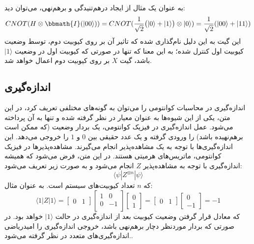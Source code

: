 به عنوان یک مثال از ایجاد درهم‌تنیدگی و برهم‌نهی، می‌توان دید:
\begin{equation}
    CNOT(H\otimes\bbmath{I}(|00\rangle)) = CNOT(\frac{1}{\sqrt{2}} \big( |0\rangle + |1\rangle \big) \otimes |0\rangle ) = \frac{1}{\sqrt{2}} (|00\rangle + |11\rangle)
\end{equation}
این گیت به این دلیل نام‌گذاری شده که تاثیر آن بر روی کیوبیت دوم، توسط وضعیت کیوبیت اول کنترل شده؛ به این معنا که تنها در صورتی که کیوبیت اول در وضعیت
$|1\rangle$
باشد، گیت 
$X$
بر روی کیوبیت دوم اعمال خواهد شد.

\subsection{اندازه‌گیری}
اندازه‌گیری در محاسبات کوانتومی را می‌توان به گونه‌های مختلفی تعریف کرد، در این متن، یکی از این شیوه‌ها به عنوان معیار در نظر گرفته شده و تنها به آن پرداخته می‌شود.
عمل اندازه‌گیری در فیزیک کوانتومی، یک بردار وضعیت (که ممکن است برهم‌نهیده باشد) را ورودی گرفته و یک عدد حقیقی بین
$0$
و
$1$
را خروجی می‌دهد.
این اندازه‌گیری‌ها با توجه به یک مشاهده‌پذیر 
انجام می‌گیرند. مشاهده‌پذیرها در فیزیک کوانتومی، ماتریس‌های هرمیتی
هستند. در این متن، فرض می‌شود که همیشه اندازه‌گیری با توجه به مشاهده‌پذیر 
$Z$
انجام می‌شود و به صورت زیر تعریف می‌شود:
\begin{equation}
    \langle \psi| Z^{\otimes n} | \psi\rangle
\end{equation}
که
$n$
تعداد کیوبیت‌های سیستم است. به عنوان مثال:
\begin{equation}
    \langle 1 | Z | 1 \rangle = 
    \begin{bmatrix}
    0 & 1
    \end{bmatrix} 
    \begin{bmatrix}
    1 & 0 \\[3pt]
    0 & -1 \\[3pt]
    \end{bmatrix}
    \begin{bmatrix}
    0 \\[3pt] 1
    \end{bmatrix} 
    = \begin{bmatrix}
    0 & 1
    \end{bmatrix} 
    \begin{bmatrix}
    0 \\[3pt] -1
    \end{bmatrix}
    = -1
\end{equation}
که معادل قرار گرفتن وضعیت کیوبیت بعد از اندازه‌گیری در حالت 
$|1\rangle$
خواهد بود. در صورتی که بردار موردنظر دچار برهم‌نهی باشد، خروجی اندازه‌گیری را امیدریاضی اندازه‌گیری‌های متعدد در نظر گرفته می‌شود..

